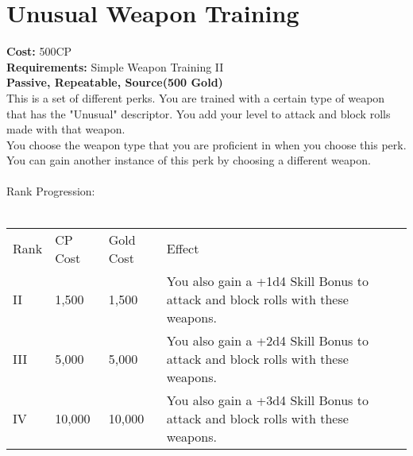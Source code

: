 \section{Unusual Weapon Training}\label{perk:unusualWeaponTraining}
\textbf{Cost:} 500CP\\
\textbf{Requirements:} Simple Weapon Training II\\
\textbf{Passive, Repeatable, Source(500 Gold)}\\
This is a set of different perks.
You are trained with a certain type of weapon that has the "Unusual" descriptor.
You add your level to attack and block rolls made with that weapon.\\
You choose the weapon type that you are proficient in when you choose this perk.
You can gain another instance of this perk by choosing a different weapon.\\
\\
Rank Progression:\\
\\
\begin{tabular}{l | l | l | l}
	Rank & CP Cost & Gold Cost & Effect\\
	II & 1,500 & 1,500 & You also gain a +1d4 Skill Bonus to attack and block rolls with these weapons.\\
	III & 5,000 & 5,000 & You also gain a +2d4 Skill Bonus to attack and block rolls with these weapons.\\
	IV & 10,000 & 10,000 & You also gain a +3d4 Skill Bonus to attack and block rolls with these weapons.\\
\end{tabular}